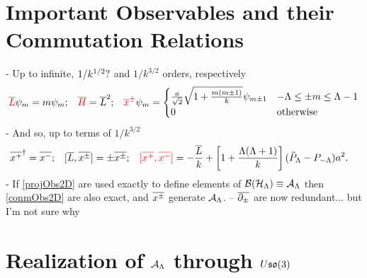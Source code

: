 \section{Important Observables and their Commutation Relations}

{
    \color{gray}
    
    - Up to infinite, $1/k^{1/2}\textcolor{blue}{?}$ and $1/k^{3/2}$ orders, respectively
    \begin{align}
    \label{projObs2D}
        \textcolor{red}{\overline{L}} \psi_m &= m \psi_m; & 
        \textcolor{red}{\overline{H}} &= \overline{L}^2; & 
        \textcolor{red}{\overline{x}^\pm} \psi_m = 
            \begin{cases}
                \frac{a}{\sqrt{2}} \sqrt{ 1 + \frac{m(m \pm 1)}{k} } \psi_{m \pm 1} & -\Lambda \leq \pm m \leq \Lambda - 1 \\
                0 & \text{otherwise}
            \end{cases}
    \end{align}
    - And so, up to terms of $1/k^{3/2}$
    \begin{align}
        \label{conmObs2D}
        \overline{x^+}^\dagger &= \overline{x^-}; &
        [\overline{L}, \overline{x^\pm}] &= \pm \overline{x^\pm}; &
        \textcolor{red}{[\overline{x^+}, \overline{x^-}]} &= - \frac{\overline{L}}{k} + \left[1 + \frac{\Lambda(\Lambda+1)}{k}\right] (\tilde P_{\Lambda} - P_{-\Lambda})a^2.
    \end{align}
     - If \eqref{projObs2D} are used exactly to define elements of $\mathcal B(\mathcal H_\Lambda) \equiv \mathcal A_\Lambda$ then \eqref{conmObs2D} are also exact, and $\overline{x^\pm}$ generate $\mathcal A_\Lambda$. -- $\overline{\partial_\pm}$ are now redundant... but I'm not sure why
     
}

\linea


\section{Realization of $\mathcal A_\Lambda$ through $U\mathfrak{so}(3)$}

